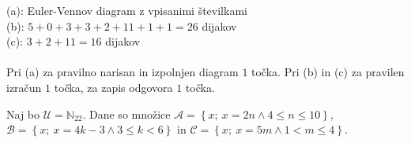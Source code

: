 \documentclass[addpoints]{exam}
\begin{document}
\begin{questions}

    \begin{solution}[8cm]
        (a): Euler-Vennov diagram z vpisanimi številkami \\
        (b): $5+0+3+3+2+11+1+1=26$ dijakov \\
        (c): $3+2+11=16$ dijakov \\ \\
        Pri (a) za pravilno narisan in izpolnjen diagram $1$ točka. Pri (b) in (c) za pravilen izračun $1$ točka, za zapis odgovora $1$ točka.
    \end{solution}




    \newpage

    \question
    Naj bo $\mathcal{U}=\mathbb{N}_{22}$. Dane so množice $\mathcal{A}=\left\{x;\ x=2n \land 4\leq n \leq10\right\}$, $\mathcal{B}=\left\{x;\ x=4k-3 \land 3\leq k< 6\right\}$ in $\mathcal{C}=\left\{x;\ x=5m \land 1<m\leq 4\right\}$. 


\end{questions}
\end{document}
